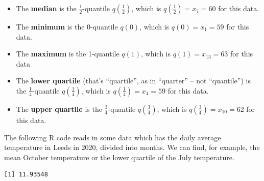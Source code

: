 \documentclass[
  letterpaper,
  DIV=11,
  numbers=noendperiod]{scrreprt}
\newenvironment{Shaded}{\begin{snugshade}}{\end{snugshade}}
\newcommand{\AttributeTok}[1]{\textcolor[rgb]{0.40,0.45,0.13}{#1}}
\newcommand{\DecValTok}[1]{\textcolor[rgb]{0.68,0.00,0.00}{#1}}
\newcommand{\FunctionTok}[1]{\textcolor[rgb]{0.28,0.35,0.67}{#1}}
\newcommand{\NormalTok}[1]{\textcolor[rgb]{0.00,0.23,0.31}{#1}}
\newcommand{\OtherTok}[1]{\textcolor[rgb]{0.00,0.23,0.31}{#1}}
\newcommand{\SpecialCharTok}[1]{\textcolor[rgb]{0.37,0.37,0.37}{#1}}
\newcommand{\StringTok}[1]{\textcolor[rgb]{0.13,0.47,0.30}{#1}}
\providecommand{\tightlist}{%
  \setlength{\itemsep}{0pt}\setlength{\parskip}{0pt}}\usepackage{longtable,booktabs,array}
\theoremstyle{remark}
\begin{document}
\begin{itemize}
\tightlist
\item
  The \textbf{median} is the \(\frac12\)-quantile \(q(\frac12)\), which
  is \(q(\frac12) = x_7 = 60\) for this data.
\item
  The \textbf{minimum} is the 0-quantile \(q(0)\), which is
  \(q(0) = x_1 = 59\) for this data.
\item
  The \textbf{maximum} is the 1-quantile \(q(1)\), which is
  \(q(1) = x_{13} = 63\) for this data
\item
  The \textbf{lower quartile} (that's ``quartile'', as in ``quarter'' --
  not ``quantile'') is the \(\frac14\)-quantile \(q(\frac14)\), which is
  \(q(\frac14) = x_4 = 59\) for this data.
\item
  The \textbf{upper quartile} is the \(\frac34\)-quantile
  \(q(\frac34)\), which is \(q(\frac34) = x_{10} = 62\) for this data.
\end{itemize}

The following R code reads in some data which has the daily average
temperature in Leeds in 2020, divided into months. We can find, for
example, the mean October temperature or the lower quartile of the July
temperature.

\begin{Shaded}
\end{Shaded}

\begin{verbatim}
[1] 11.93548
\end{verbatim}

\begin{Shaded}
\end{Shaded}
\end{document}
